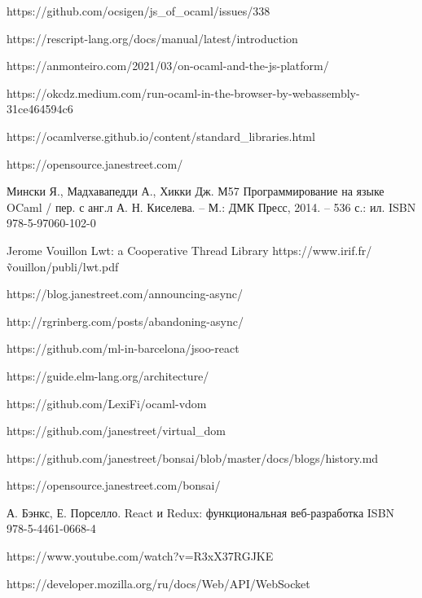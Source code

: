 \begin{thebibliography}{00}
    https://github.com/ocsigen/js\_of\_ocaml/issues/338 \TODO

    https://rescript-lang.org/docs/manual/latest/introduction \TODO

    https://anmonteiro.com/2021/03/on-ocaml-and-the-js-platform/ \TODO

    https://okcdz.medium.com/run-ocaml-in-the-browser-by-webassembly-31ce464594c6 \TODO

    https://ocamlverse.github.io/content/standard\_libraries.html \TODO

    https://opensource.janestreet.com/ \TODO

    Мински Я., Мадхавапедди А., Хикки Дж.
    М57 Программирование на языке OCaml / пер. с анг.л А. Н. Киселева. –
    М.: ДМК Пресс, 2014. – 536 с.: ил.
    ISBN 978-5-97060-102-0
    \TODO

    Jerome Vouillon Lwt: a Cooperative Thread Library \TODO
    https://www.irif.fr/\~vouillon/publi/lwt.pdf

    https://blog.janestreet.com/announcing-async/ \TODO

    http://rgrinberg.com/posts/abandoning-async/ \TODO

    https://github.com/ml-in-barcelona/jsoo-react \TODO

    https://guide.elm-lang.org/architecture/ \TODO

    https://github.com/LexiFi/ocaml-vdom \TODO

    https://github.com/janestreet/virtual\_dom \TODO

    https://github.com/janestreet/bonsai/blob/master/docs/blogs/history.md \TODO

    https://opensource.janestreet.com/bonsai/ \TODO

    А. Бэнкс, Е. Порселло. React и Redux: функциональная веб-разработка ISBN 978-5-4461-0668-4 \TODO

    https://www.youtube.com/watch?v=R3xX37RGJKE \TODO

    https://developer.mozilla.org/ru/docs/Web/API/WebSocket \TODO


\end{thebibliography}
